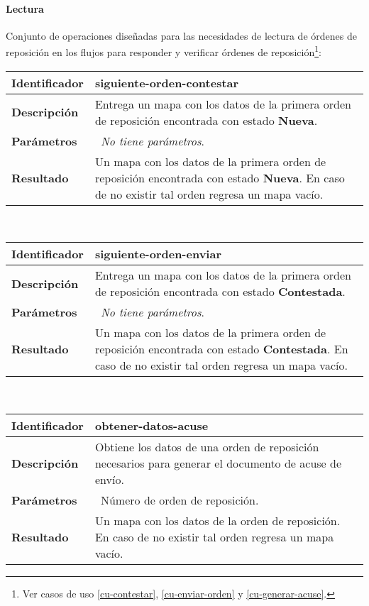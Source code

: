 \paragraph{Lectura\\}
Conjunto de operaciones diseñadas para las necesidades de lectura de órdenes de reposición en los flujos para responder y verificar órdenes de reposición\footnote{Ver casos de uso \ref{cu-contestar}, \ref{cu-enviar-orden} y \ref{cu-generar-acuse}.}:
	\vspace{5mm}\\
	\begin{tabular}{|p{}|p{}|}
		\hline
		\textbf{Identificador}	& \textbf{siguiente-orden-contestar}\\
		\hline
		\hline
		\textbf{Descripción}	& Entrega un mapa con los datos de la primera orden de reposición encontrada con estado \textbf{Nueva}.\\
		\hline
		\textbf{Parámetros} 	& \textbullet\, \textit{No tiene parámetros}.\\
		\hline
		\textbf{Resultado}		& Un mapa con los datos de la primera orden de reposición encontrada con estado \textbf{Nueva}. En caso de no existir tal orden regresa un mapa vacío.\\
		\hline
	\end{tabular}
	\vspace{5mm}\\
	\begin{tabular}{|p{}|p{}|}
		\hline
		\textbf{Identificador}	& \textbf{siguiente-orden-enviar}\\
		\hline
		\hline
		\textbf{Descripción}	& Entrega un mapa con los datos de la primera orden de reposición encontrada con estado \textbf{Contestada}.\\
		\hline
		\textbf{Parámetros} 	& \textbullet\, \textit{No tiene parámetros}.\\
		\hline
		\textbf{Resultado}		& Un mapa con los datos de la primera orden de reposición encontrada con estado \textbf{Contestada}. En caso de no existir tal orden regresa un mapa vacío.\\
		\hline
	\end{tabular}
	\vspace{5mm}\\
	\begin{tabular}{|p{}|p{}|}
		\hline
		\textbf{Identificador}	& \textbf{obtener-datos-acuse}\\
		\hline
		\hline
		\textbf{Descripción}	& Obtiene los datos de una orden de reposición necesarios para generar el documento de acuse de envío.\\
		\hline
		\textbf{Parámetros}		& \textbullet\, Número de orden de reposición.\\
		\hline
		\textbf{Resultado}		& Un mapa con los datos de la orden de reposición. En caso de no existir tal orden regresa un mapa vacío.\\
		\hline
	\end{tabular}
	\vspace{5mm}

